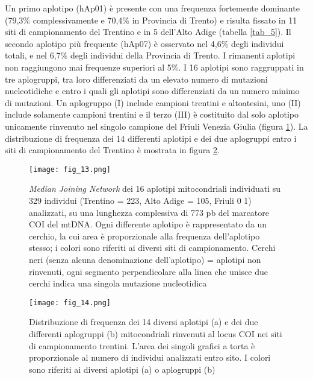 \documentclass[11pt,a4paper,italian,twoside,openany]{memoir}
\begin{document}
Un primo aplotipo (hAp01) è presente con una frequenza fortemente dominante (79,3\% complessivamente e 70,4\% in Provincia di Trento) e risulta fissato in 11 siti di campionamento del Trentino e in 5 dell'Alto Adige (tabella \ref{tab_5}). Il secondo aplotipo più frequente (hAp07) è osservato nel 4,6\% degli individui totali, e nel 6,7\% degli individui della Provincia di Trento. I rimanenti aplotipi non raggiungono mai frequenze superiori al 5\%. I 16 aplotipi sono raggruppati in tre aplogruppi, tra loro differenziati da un elevato numero di mutazioni nucleotidiche e entro i quali gli aplotipi sono differenziati da un numero minimo di mutazioni. Un aplogruppo (I) include campioni trentini e altoatesini, uno (II) include solamente campioni trentini e il terzo (III) è costituito dal solo aplotipo unicamente rinvenuto nel singolo campione del Friuli Venezia Giulia (figura \ref{fig_13}). La distribuzione di frequenza dei 14 differenti aplotipi e dei due aplogruppi entro i siti di campionamento del Trentino è mostrata in figura \ref{fig_14}.

\begin{figure}[!h]
  \centering
  \texttt{[image: fig\_13.png]}
  \caption{\emph{Median Joining Network} dei 16 aplotipi mitocondriali individuati su 329 individui (Trentino = 223, Alto Adige = 105, Friuli 0 1) analizzati, su una lunghezza complessiva di 773 pb del marcatore COI del mtDNA. Ogni differente aplotipo è rappresentato da un cerchio, la cui area è proporzionale alla frequenza dell'aplotipo stesso; i colori sono riferiti ai diversi siti di campionamento. Cerchi neri (senza alcuna denominazione dell'aplotipo) = aplotipi non rinvenuti, ogni segmento perpendicolare alla linea che unisce due cerchi indica una singola mutazione nucleotidica}
  \label{fig_13}
\end{figure}
\newpage

\begin{figure}[!h]
  \centering
  \texttt{[image: fig\_14.png]}
  \caption{Distribuzione di frequenza dei 14 diversi aplotipi (a) e dei due differenti aplogruppi (b) mitocondriali rinvenuti al locus COI nei siti di campionamento trentini. L'area dei singoli grafici a torta è proporzionale al numero di individui analizzati entro sito. I colori sono riferiti ai diversi aplotipi (a) o aplogruppi (b)}
  \label{fig_14}
\end{figure}
\end{document}

